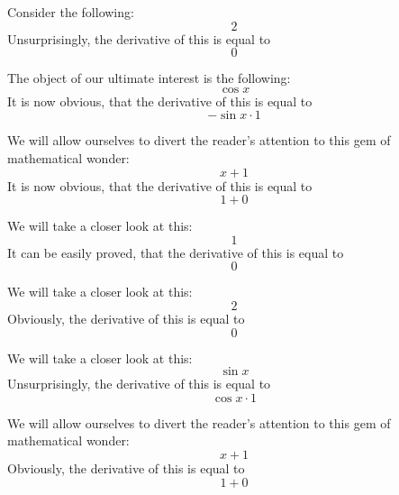 \documentclass{article}
\begin{document}
Consider the following:
\begin{equation}
2 
\end{equation}
Unsurprisingly, the derivative of this is equal to
\begin{equation}
0 
\end{equation}

The object of our ultimate interest is the following:
\begin{equation}
\cos x 
\end{equation}
It is now obvious, that the derivative of this is equal to
\begin{equation}
-\sin x \cdot 1 
\end{equation}

We will allow ourselves to divert the reader's attention to this gem of mathematical wonder:
\begin{equation}
x + 1 
\end{equation}
It is now obvious, that the derivative of this is equal to
\begin{equation}
1 + 0 
\end{equation}

We will take a closer look at this:
\begin{equation}
1 
\end{equation}
It can be easily proved, that the derivative of this is equal to
\begin{equation}
0 
\end{equation}

We will take a closer look at this:
\begin{equation}
2 
\end{equation}
Obviously, the derivative of this is equal to
\begin{equation}
0 
\end{equation}

We will take a closer look at this:
\begin{equation}
\sin x 
\end{equation}
Unsurprisingly, the derivative of this is equal to
\begin{equation}
\cos x \cdot 1 
\end{equation}

We will allow ourselves to divert the reader's attention to this gem of mathematical wonder:
\begin{equation}
x + 1 
\end{equation}
Obviously, the derivative of this is equal to
\begin{equation}
1 + 0 
\end{equation}
\end{document}
